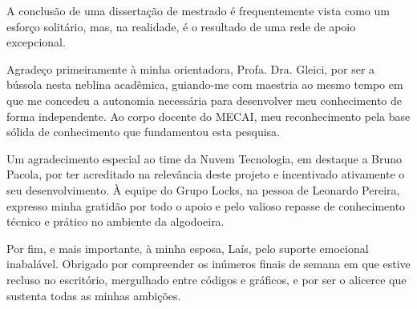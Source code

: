 A conclusão de uma dissertação de mestrado é frequentemente vista como um esforço solitário, mas, na realidade, é o resultado de uma rede de apoio excepcional.

Agradeço primeiramente à minha orientadora, Profa. Dra. Gleici, por ser a bússola nesta neblina acadêmica, guiando-me com maestria ao mesmo tempo em que me concedeu a autonomia necessária para desenvolver meu conhecimento de forma independente. Ao corpo docente do MECAI, meu reconhecimento pela base sólida de conhecimento que fundamentou esta pesquisa.

Um agradecimento especial ao time da Nuvem Tecnologia, em destaque a Bruno Pacola, por ter acreditado na relevância deste projeto e incentivado ativamente o seu desenvolvimento. À equipe do Grupo Locks, na pessoa de Leonardo Pereira, expresso minha gratidão por todo o apoio e pelo valioso repasse de conhecimento técnico e prático no ambiente da algodoeira.

Por fim, e mais importante, à minha esposa, Laís, pelo suporte emocional inabalável. Obrigado por compreender os inúmeros finais de semana em que estive recluso no escritório, mergulhado entre códigos e gráficos, e por ser o alicerce que sustenta todas as minhas ambições.

